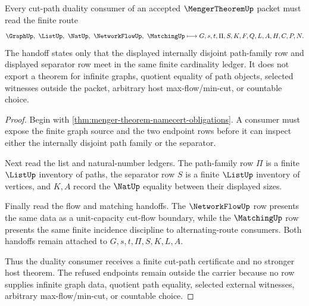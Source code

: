 \begin{theorem}
\label{thm:menger-theorem-cut-path-duality-handoff}
Every cut-path duality consumer of an accepted $\MengerTheoremUp$ packet must read the finite route
$$
\GraphUp,\ \ListUp,\ \NatUp,\ \NetworkFlowUp,\ \MatchingUp
\longmapsto
G,s,t,\Pi,S,K,F,Q,L,A,H,C,P,N .
$$
The handoff states only that the displayed internally disjoint path-family row and displayed separator row meet in the same finite cardinality ledger. It does not export a theorem for infinite graphs, quotient equality of path objects, selected witnesses outside the packet, arbitrary host max-flow/min-cut, or countable choice.
\end{theorem}
\begin{proof}
Begin with \autoref{thm:menger-theorem-namecert-obligations}. A consumer must expose the finite graph source and the two endpoint rows before it can inspect either the internally disjoint path family or the separator.

Next read the list and natural-number ledgers. The path-family row $\Pi$ is a finite $\ListUp$ inventory of paths, the separator row $S$ is a finite $\ListUp$ inventory of vertices, and $K,A$ record the $\NatUp$ equality between their displayed sizes.

Finally read the flow and matching handoffs. The $\NetworkFlowUp$ row presents the same data as a unit-capacity cut-flow boundary, while the $\MatchingUp$ row presents the same finite incidence discipline to alternating-route consumers. Both handoffs remain attached to $G,s,t,\Pi,S,K,L,A$.

Thus the duality consumer receives a finite cut-path certificate and no stronger host theorem. The refused endpoints remain outside the carrier because no row supplies infinite graph data, quotient path equality, selected external witnesses, arbitrary max-flow/min-cut, or countable choice.
\end{proof}



